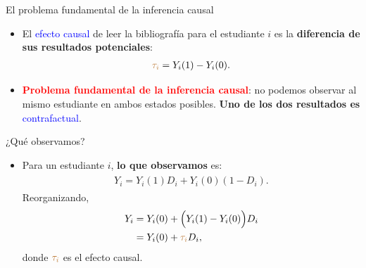 \documentclass[10pt, xcolor=dvipsnames]{beamer}
\begin{document}
\begin{frame}{El problema fundamental de la inferencia causal}
\begin{itemize}\setlength{\itemsep}{1.5em}
    \item El \textcolor{blue}{efecto causal} de leer la bibliografía para el estudiante $i$ es la \textbf{diferencia de sus resultados potenciales}:
    \begin{align*}
        \textcolor{brown}{\tau_i} = Y_i(1) - Y_i(0).
    \end{align*}
    \item \textcolor{red}{\textbf{Problema fundamental de la inferencia causal}}: no podemos observar al mismo estudiante en ambos estados posibles. \textbf{Uno de los dos resultados es} \textcolor{blue}{contrafactual}.	
\end{itemize}
\end{frame}


\begin{frame}{¿Qué observamos?}
\begin{itemize}\setlength{\itemsep}{1.5em}
    \item Para un estudiante $i$, \textbf{lo que observamos} es:
    \begin{align*}
    \begin{split}
        Y_i = Y_i(1) D_i + Y_i(0) (1-D_i).
    \end{split}
    \end{align*}
    Reorganizando,
    \begin{align*}
    \begin{split}
        Y_i &= Y_i(0) + \Big(Y_i(1)-Y_i(0)\Big) D_i \\
            &= Y_i(0) + \textcolor{brown}{\tau_i} D_i,
    \end{split}
    \end{align*}
    donde \(\textcolor{brown}{\tau_i}\) es el efecto causal.
\end{itemize}
\end{frame}
\end{document}
